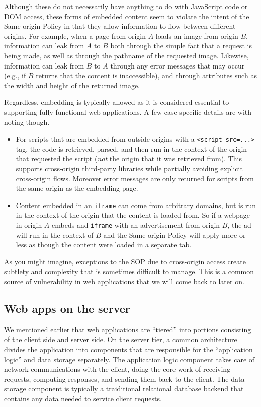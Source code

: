 \documentclass[11pt,twoside]{scrartcl}
\begin{document}
Although these do not necessarily have anything to do with JavaScript code or DOM access, these forms of embedded content seem to violate the intent of the Same-origin Policy in that they allow information to flow between different origins. For example, when a page from origin $A$ loads an image from origin $B$, information can leak from $A$ to $B$ both through the simple fact that a request is being made, as well as through the pathname of the requested image. Likewise, information can leak from $B$ to $A$ through any error messages that may occur (e.g., if $B$ returns that the content is inaccessible), and through attributes such as the width and height of the returned image.

Regardless, embedding is typically allowed as it is considered essential to supporting fully-functional web applications. A few case-specific details are with noting though.
\begin{itemize}
\item For scripts that are embedded from outside origins with a \verb'<script src=...>' tag, the code is retrieved, parsed, and then run in the context of the origin that requested the script (\emph{not} the origin that it was retrieved from). This supports cross-origin third-party libraries while partially avoiding explicit cross-origin flows. Moreover error messages are only returned for scripts from the same origin as the embedding page.
\item Content embedded in an \verb'iframe' can come from arbitrary domains, but is run in the context of the origin that the content is loaded from. So if a webpage in origin $A$ embeds and \verb'iframe' with an advertisement from origin $B$, the ad will run in the context of $B$ and the Same-origin Policy will apply more or less as though the content were loaded in a separate tab.
\end{itemize}
As you might imagine, exceptions to the SOP due to cross-origin access create subtlety and complexity that is sometimes difficult to manage. This is a common source of vulnerability in web applications that we will come back to later on.

\subsection{Web apps on the server}

We mentioned earlier that web applications are ``tiered'' into portions consisting of the client side and server side. On the server tier, a common architecture divides the application into components that are responsible for the ``application logic'' and data storage separately. The application logic component takes care of network communications with the client, doing the core work of receiving requests, computing responses, and sending them back to the client. The data storage component is typically a traiditional relational database backend that contains any data needed to service client requests.
\end{document}
